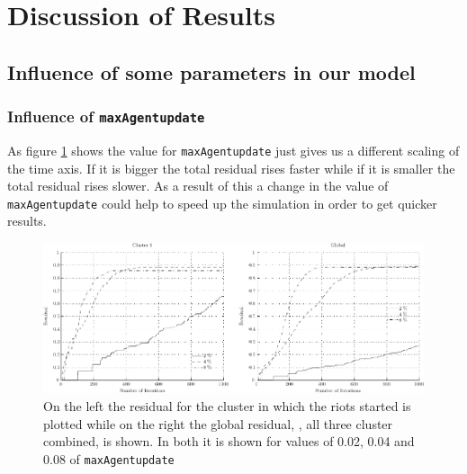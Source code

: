 \section{Discussion of Results}
\label{sec:discussionofresults}

\subsection{Influence of some parameters in our model}

\subsubsection{Influence of \texttt{maxAgentupdate}}
\label{sec:maxAgentUpdate}
As figure \ref{influencemaxAgentUpdate} shows the value for
\texttt{maxAgentupdate} just gives us a different scaling of the time axis. If
it is bigger the total residual rises faster while if it is smaller the total
residual rises slower. As a result of this a change in the value of
\texttt{maxAgentupdate} could help to speed up the simulation in order to get
quicker results.

\begin{figure}
\centering
\includegraphics[width= \textwidth]{influenceOfmaxUpdate/influenceMaxAgentUpdate.pdf}
\caption{On the left the residual for the cluster in which the riots started is
  plotted while on the right the global residual, \ie, all three cluster
  combined, is shown. In both it is shown for values of 0.02, 0.04 and 0.08 of
  \texttt{maxAgentupdate}}
\label{influencemaxAgentUpdate}
\end{figure}


